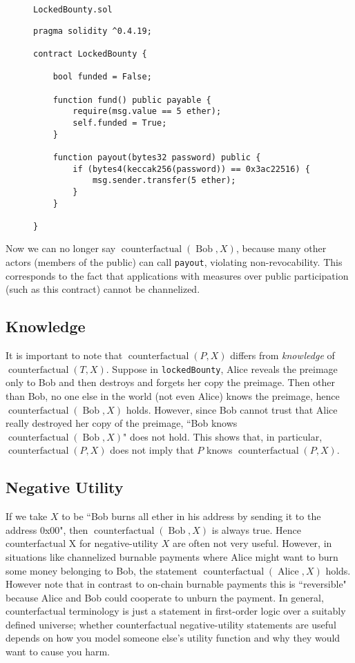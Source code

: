 \documentclass[prb,floatfix,reprint,nofootinbib,amsmath,amssymb,epsfig,pre,floats,letterpaper,groupedaffiliation,tightenlines,allcolors=blue,11pt]{revtex4}
\theoremstyle{definition}
\theoremstyle{definition}
\theoremstyle{definition}
\DeclareMathOperator{\counterfactual}{counterfactual}
\DeclareMathOperator{\Alice}{Alice}
\DeclareMathOperator{\Bob}{Bob}
\begin{document}
\begin{appendix}
\begin{figure}[H]
\begin{soliditysnippet}{\texttt{LockedBounty.sol}}
\begin{lstlisting}[language=Solidity]
pragma solidity ^0.4.19;

contract LockedBounty {

    bool funded = False;

    function fund() public payable {
        require(msg.value == 5 ether);
        self.funded = True;
    }

    function payout(bytes32 password) public {
        if (bytes4(keccak256(password)) == 0x3ac22516) {
            msg.sender.transfer(5 ether);
        }
    }

}
\end{lstlisting}
\end{soliditysnippet}
\label{figure:lockedBounty}
\end{figure}

Now we can no longer say $\counterfactual(\Bob, X)$, because many other actors (members of the public) can call \texttt{payout}, violating non-revocability. This corresponds to the fact that applications with measures over public participation (such as this contract) cannot be channelized.

\subsection{Knowledge}

It is important to note that $\counterfactual(P, X)$ differs from \textit{knowledge} of $\counterfactual(T, X)$. Suppose in \texttt{lockedBounty}, Alice reveals the preimage only to Bob and then destroys and forgets her copy the preimage. Then other than Bob, no one else in the world (not even Alice) knows the preimage, hence $\counterfactual(\Bob, X)$ holds. However, since Bob cannot trust that Alice really destroyed her copy of the preimage, ``Bob knows $\counterfactual(\Bob, X)$" does not hold. This shows that, in particular, $\counterfactual(P, X)$ does not imply that $P$ knows $\counterfactual(P, X)$.

\subsection{Negative Utility}

If we take $X$ to be ``Bob burns all ether in his address by sending it to the address 0x00", then $\counterfactual(\Bob, X)$ is always true. Hence counterfactual X for negative-utility $X$ are often not very useful. However, in situations like channelized burnable payments where Alice might want to burn some money belonging to Bob, the statement $\counterfactual(\Alice, X)$ holds. However note that in contrast to on-chain burnable payments this is ``reversible" because  Alice and Bob could cooperate to unburn the payment. In general, counterfactual terminology is just a statement in first-order logic over a suitably defined universe; whether counterfactual negative-utility statements are useful depends on how you model someone else's utility function and why they would want to cause you harm.


\end{appendix}
\end{document}
